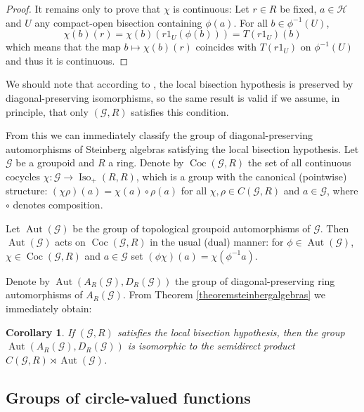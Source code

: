 \documentclass[letter,11pt]{amsart}
\theoremstyle{plain}		\newtheorem{theorem}[generalnumbering]{Theorem}
\theoremstyle{plain}		\newtheorem{corollary}[generalnumbering]{Corollary}
\theoremstyle{definition}		\newtheorem{definition}[generalnumbering]{Definition}
\theoremstyle{definition}		\newtheorem{example}[generalnumbering]{Example}
\theoremstyle{plain}		\newtheorem{proposition}[generalnumbering]{Proposition}
\theoremstyle{plain}		\newtheorem{lemma}[generalnumbering]{Lemma}
\theoremstyle{plain}    \newtheorem{plainstyle}[generalnumbering]{\namefordifferentenvironment}
\theoremstyle{plain}    \newtheorem*{plainstyle*}{\namefordifferentenvironment}
\theoremstyle{definition}    \newtheorem{definitionstyle}[generalnumbering]{\namefordifferentenvironment}
\theoremstyle{definition}    \newtheorem*{definitionstyle*}{\namefordifferentenvironment}
\begin{document}
\begin{proof}
	It remains only to prove that $\chi$ is continuous: Let $r\in R$ be fixed, $a\in\mathcal{H}$ and $U$ any compact-open bisection containing $\phi(a)$. For all $b\in\phi^{-1}(U)$,
	\[\chi(b)(r)=\chi(b)(r1_U(\phi(b)))=T(r1_U)(b)\]
	which means that the map $b\mapsto\chi(b)(r)$ coincides with $T(r1_U)$ on $\phi^{-1}(U)$ and thus it is continuous.
\end{proof}

We should note that according to \cite{arxiv1711.01903v2}, the local bisection hypothesis is preserved by diagonal-preserving isomorphisms, so the same result is valid if we assume, in principle, that only $(\mathcal{G},R)$ satisfies this condition.

From this we can immediately classify the group of diagonal-preserving automorphisms of Steinberg algebras satisfying the local bisection hypothesis. Let $\mathcal{G}$ be a groupoid and $R$ a ring. Denote by $\operatorname{Coc}(\mathcal{G},R)$ the set of all continuous cocycles $\chi\colon\mathcal{G}\to\operatorname{Iso}_+(R,R)$, which is a group with the canonical (pointwise) structure: $(\chi\rho)(a)=\chi(a)\circ\rho(a)$ for all $\chi,\rho\in C(\mathcal{G},R)$ and $a\in\mathcal{G}$, where $\circ$ denotes composition.

Let $\operatorname{Aut}(\mathcal{G})$ be the group of topological groupoid automorphisms of $\mathcal{G}$. Then $\operatorname{Aut}(\mathcal{G})$ acts on $\operatorname{Coc}(\mathcal{G},R)$ in the usual (dual) manner: for $\phi\in\operatorname{Aut}(\mathcal{G})$, $\chi\in\operatorname{Coc}(\mathcal{G},R)$ and $a\in\mathcal{G}$ set $(\phi\chi)(a)=\chi(\phi^{-1}a)$.

Denote by $\operatorname{Aut}(A_R(\mathcal{G}),D_R(\mathcal{G}))$ the group of diagonal-preserving ring automorphisms of $A_R(\mathcal{G})$. From Theorem \ref{theoremsteinbergalgebras} we immediately obtain:

\begin{corollary}\label{corollaryclassificationofautomorphismsofsteinbergalgebras}
	If $(\mathcal{G},R)$ satisfies the local bisection hypothesis, then the group $\operatorname{Aut}(A_R(\mathcal{G}),D_R(\mathcal{G}))$ is isomorphic to the semidirect product $C(\mathcal{G},R)\rtimes\operatorname{Aut}(\mathcal{G})$.
\end{corollary}

\subsection{Groups of circle-valued functions}
\end{document}
